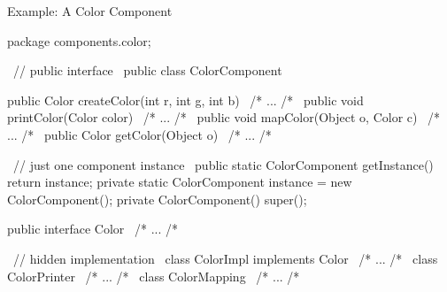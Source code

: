 \begin{frame}[fragile]{Example: A Color Component \mytitlesource{\fospl}}
	\begin{mycolumns}[columns=2,widths={40,60}]
		\mynextcolumn
{\small
\begin{codetight}{}
package components.color;

~// public interface~
public class ColorComponent {
	public Color createColor(int r, int g, int b) { ~/* ... /*~ }
	public void printColor(Color color) { ~/* ... /*~ }
	public void mapColor(Object o, Color c) { ~/* ... /*~ }
	public Color getColor(Object o) { ~/* ... /*~ }
	
	~// just one component instance~
	public static ColorComponent getInstance() { return instance; }
	private static ColorComponent instance = new ColorComponent();
	private ColorComponent() { super(); }
}
public interface Color { ~/* ... /*~ }

~// hidden implementation~
class ColorImpl implements Color { ~/* ... /*~ }
class ColorPrinter { ~/* ... /*~ }
class ColorMapping { ~/* ... /*~ }
\end{codetight}
}
	\end{mycolumns}
\end{frame}

